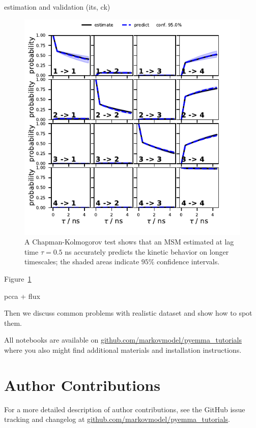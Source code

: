\documentclass[9pt,tutorial,lineno,onehalfspacing]{livecoms}
\newcommand{\githubrepository}{\url{github.com/markovmodel/pyemma_tutorials}}
\begin{document}
estimation and validation (its, ck)

\begin{figure}
\includegraphics{figure_2}
\caption{A Chapman-Kolmogorov test shows that an MSM estimated at lag time $\tau=0.5$ ns accurately predicts the kinetic behavior on longer timescales; the shaded areas indicate $95\%$ confidence intervals.}
\label{fig:ck}
\end{figure}

Figure~\ref{fig:ck}

pcca + flux

Then we discuss common problems with realistic dataset and show how to spot them.

All notebooks are available on \githubrepository{} where you also might find additional materials and installation instructions.


\section{Author Contributions}
%
For a more detailed description of author contributions, see the GitHub issue tracking and changelog at \githubrepository{}.
\end{document}
